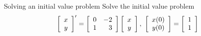 \begin{example}{Solving an initial value problem}{}
Solve the initial value problem
\begin{equation*}
\left[
\begin{array}{c}
x \\
y
\end{array}
\right] ^{\prime }=\left[ 
\begin{array}{rr}
0 & -2 \\
1 & 3
\end{array}
\right] \left[
\begin{array}{c}
x \\
y
\end{array}
\right] ,\ \left[
\begin{array}{c}
x(0)\\
y(0)
\end{array}
\right]  =\left[
\begin{array}{c}
1 \\
1
\end{array}
\right]
\end{equation*}
\end{example}

